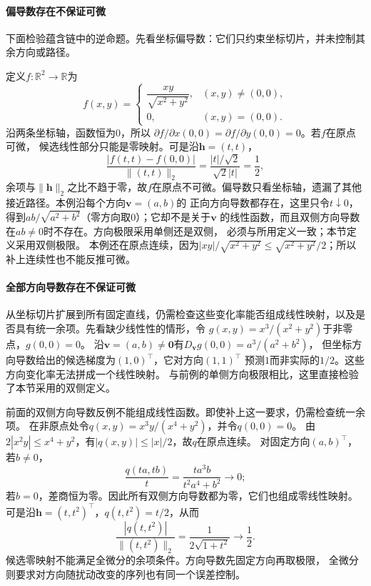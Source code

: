 \paragraph{偏导数存在不保证可微}
下面检验蕴含链中的逆命题。先看坐标偏导数：它们只约束坐标切片，并未控制其余方向或路径。
\begin{example}[偏导数存在但不可微]
\label{ex:analysis-partials-not-differentiable}
定义$f:\mathbb{R}^2\to\mathbb{R}$为
\[   f(x,y)=
\begin{cases}     \dfrac{xy}{\sqrt{x^2+y^2}}, & (x,y)\neq(0,0),\\[6pt]     0, & (x,y)=(0,0).
\end{cases} \]
沿两条坐标轴，函数恒为$0$，所以 $\partial f/\partial x(0,0)=\partial f/\partial y(0,0)=0$。若$f$在原点可微， 候选线性部分只能是零映射。可是沿$\bm{h}=(t,t)$，
\[   \frac{|f(t,t)-f(0,0)|}{\lVert(t,t)\rVert_2}   =   \frac{|t|/\sqrt{2}}{\sqrt{2}|t|}   =\frac12, \]
余项与$\lVert\bm{h}\rVert_2$之比不趋于零，故$f$在原点不可微。偏导数只看坐标轴，遗漏了其他接近路径。本例沿每个方向$\bm v=(a,b)$的
正向方向导数都存在，这里只令$t\downarrow0$，得到$ab/\sqrt{a^2+b^2}$（零方向取$0$）；它却不是关于$\bm v$
的线性函数，而且双侧方向导数在$ab\neq0$时不存在。方向极限采用单侧还是双侧，
必须与所用定义一致；本节定义采用双侧极限。
本例还在原点连续，因为$|xy|/\sqrt{x^2+y^2}\leq\sqrt{x^2+y^2}/2$；所以补上连续性也不能反推可微。
\end{example}

\paragraph{全部方向导数存在不保证可微}
从坐标切片扩展到所有固定直线，仍需检查这些变化率能否组成线性映射，以及是否具有统一余项。先看缺少线性性的情形，令
$g(x,y)=x^3/(x^2+y^2)$于非零点，$g(0,0)=0$。
沿$\bm v=(a,b)\neq\bm0$有$D_{\bm v}g(0,0)=a^3/(a^2+b^2)$，
但坐标方向导数给出的候选梯度为$(1,0)^\top$，它对方向$(1,1)^\top$
预测$1$而非实际的$1/2$。这些方向变化率无法拼成一个线性映射。
与前例的单侧方向极限相比，这里直接检验了本节采用的双侧定义。

\begin{example}[所有方向导数为零仍不足以可微]
\label{ex:multivariable-linear-directionals-not-differentiable}
前面的双侧方向导数反例不能组成线性函数。即使补上这一要求，仍需检查统一余项。
在非原点处令$q(x,y)=x^3y/(x^4+y^2)$，并令$q(0,0)=0$。
由$2|x^2y|\leq x^4+y^2$，有$|q(x,y)|\leq|x|/2$，故$q$在原点连续。
对固定方向$(a,b)^\top$，若$b\neq0$，
\[
 \frac{q(ta,tb)}t=\frac{t a^3b}{t^2a^4+b^2}\longrightarrow0;
\]
若$b=0$，差商恒为零。因此所有双侧方向导数都为零，它们也组成零线性映射。
可是沿$\bm h=(t,t^2)^\top$，$q(t,t^2)=t/2$，从而
\[
 \frac{|q(t,t^2)|}{\lVert(t,t^2)\rVert_2}
 =\frac1{2\sqrt{1+t^2}}\longrightarrow\frac12.
\]
候选零映射不能满足全微分的余项条件。方向导数先固定方向再取极限，
全微分则要求对方向随扰动改变的序列也有同一个误差控制。
\end{example}

